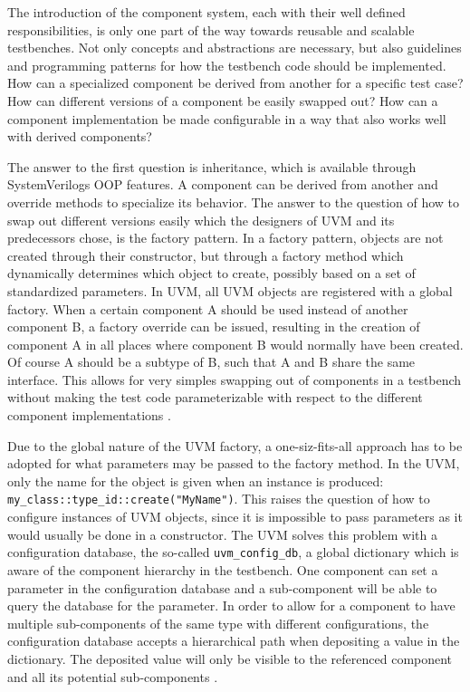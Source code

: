 \documentclass[11pt,a4paper]{report}
\newcommand{\ttt}{\texttt}
\begin{document}
The introduction of the component system, each with their well defined responsibilities, is only one part of the way
towards reusable and scalable testbenches. Not only concepts and abstractions are necessary, but also guidelines and
programming patterns for how the testbench code should be implemented. How can a specialized component be derived
from another for a specific test case? How can different versions of a component be easily swapped out? How can a
component implementation be made configurable in a way that also works well with derived components?

The answer to the first question is inheritance, which is available through SystemVerilogs OOP features. A component
can be derived from another and override methods to specialize its behavior. The answer to the question of how to
swap out different versions easily which the designers of UVM and its predecessors chose, is the factory pattern. In
a factory pattern, objects are not created through their constructor, but through a factory method which dynamically
determines which object to create, possibly based on a set of standardized parameters. In UVM, all UVM objects are
registered with a global factory. When a certain component A should be used instead of another component B, a factory
override can be issued, resulting in the creation of component A in all places where component B would normally have
been created. Of course A should be a subtype of B, such that A and B share the same interface. This allows for very
simples swapping out of components in a testbench without making the test code parameterizable with respect to the
different component implementations \cite[Ch. 13]{salemi2013uvm}.

Due to the global nature of the UVM factory, a one-siz-fits-all approach has to be adopted for what parameters may be
passed to the factory method. In the UVM, only the name for the object is given when an instance is produced:
\ttt{my\_class::type\_id::create("MyName")}. This raises the question of how to configure instances of UVM objects,
since it is impossible to pass parameters as it would usually be done in a constructor. The UVM solves this problem
with a configuration database, the so-called \ttt{uvm\_config\_db}, a global dictionary which is aware of the
component hierarchy in the testbench. One component can set a parameter in the configuration database and a
sub-component will be able to query the database for the parameter. In order to allow for a component to have
multiple sub-components of the same type with different configurations, the configuration database accepts a
hierarchical path when depositing a value in the dictionary. The deposited value will only be visible to the
referenced component and all its potential sub-components \cite{configdb}.
\end{document}
